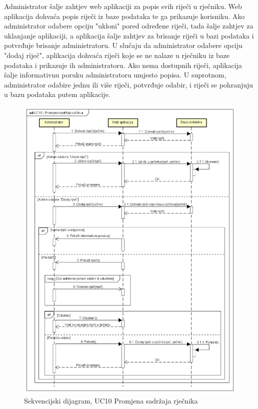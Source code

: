 Administrator šalje zahtjev web aplikaciji za popis svih riječi u rječniku. Web aplikacija dohvaća popis riječi iz baze podataka te ga prikazuje korisniku. Ako administrator odabere opciju "ukloni" pored određene riječi, tada šalje zahtjev za uklanjanje aplikaciji, a aplikacija šalje zahtjev za brisanje riječi u bazi podataka i potvrđuje brisanje administratoru. U slučaju da administrator odabere opciju "dodaj riječ", aplikacija dohvaća riječi koje se ne nalaze u rječniku iz baze podataka i prikazuje ih administratoru. Ako nema dostupnih riječi, aplikacija šalje informativnu poruku administratoru umjesto popisa. U suprotnom, administrator odabire jednu ili više riječi, potvrđuje odabir, i riječi se pohranjuju u bazu podataka putem aplikacije.

\begin{figure}[p]
	\includegraphics[scale=0.55]{dijagrami/UC10 - Promjena sadržaja rječinka.png}
	\centering
	\caption{Sekvencijski dijagram, UC10 Promjena sadržaja rječnika}
	\label{fig:uc-promjena-rjecnika}
\end{figure}

